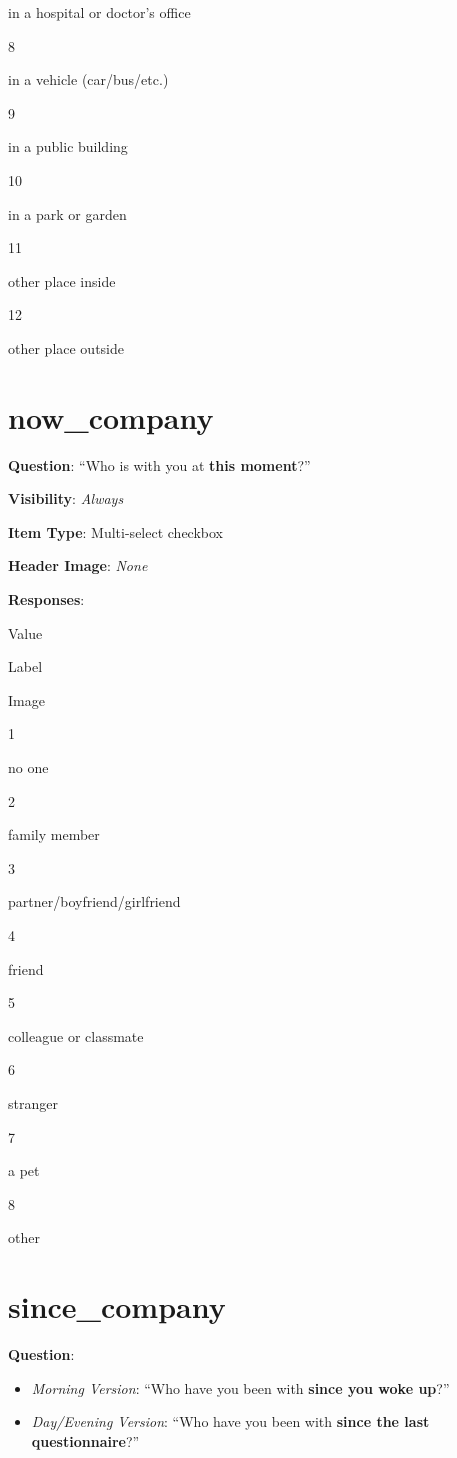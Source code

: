 \documentclass[]{book}
\providecommand{\tightlist}{%
  \setlength{\itemsep}{0pt}\setlength{\parskip}{0pt}}
\begin{document}
in a hospital or doctor's office

8

in a vehicle (car/bus/etc.)

9

in a public building

10

in a park or garden

11

other place inside

12

other place outside

\hypertarget{now_company}{%
\section{now\_company}\label{now_company}}

\textbf{Question}: ``Who is with you at \textbf{this moment}?''

\textbf{Visibility}: \emph{Always}

\textbf{Item Type}: Multi-select checkbox

\textbf{Header Image}: \emph{None}

\textbf{Responses}:

Value

Label

Image

1

no one

2

family member

3

partner/boyfriend/girlfriend

4

friend

5

colleague or classmate

6

stranger

7

a pet

8

other

\hypertarget{since_company}{%
\section{since\_company}\label{since_company}}

\textbf{Question}:

\begin{itemize}
\tightlist
\item
  \emph{Morning Version}: ``Who have you been with \textbf{since you woke up}?''
\item
  \emph{Day/Evening Version}: ``Who have you been with \textbf{since the last questionnaire}?''
\end{itemize}
\end{document}
